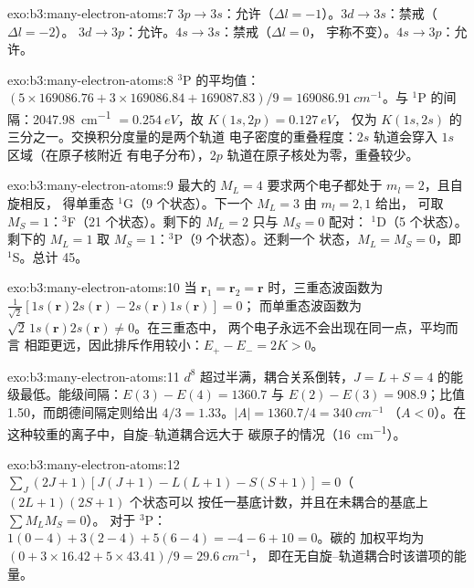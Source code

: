 \begin{solution}{exo:b3:many-electron-atoms:7}
$3p \to 3s$：允许（$\Delta l = -1$）。$3d \to 3s$：禁戒（$\Delta l = -2$）。
$3d \to 3p$：允许。$4s \to 3s$：禁戒（$\Delta l = 0$，
宇称不变）。$4s \to 3p$：允许。
\end{solution}

\begin{solution}{exo:b3:many-electron-atoms:8}
${}^3$P 的平均值：$(5 \times 169086.76 + 3 \times 169086.84 + 169087.83)/9 =
\qty{169086.91}{cm^{-1}}$。与 ${}^1$P 的间隔：\qty{2047.98}{cm^{-1}} $=
\qty{0.254}{eV}$，故 $K(1s,2p) = \qty{0.127}{eV}$，
仅为 $K(1s,2s)$ 的三分之一。交换积分度量的是两个轨道
电子密度的重叠程度：$2s$ 轨道会穿入 $1s$ 区域（在原子核附近
有电子分布），$2p$ 轨道在原子核处为零，重叠较少。
\end{solution}

\begin{solution}{exo:b3:many-electron-atoms:9}
最大的 $M_L = 4$ 要求两个电子都处于 $m_l = 2$，且自旋相反，
得单重态 ${}^1$G（9 个状态）。下一个 $M_L = 3$ 由 $m_l = 2, 1$ 给出，
可取 $M_S = 1$：${}^3$F（21 个状态）。剩下的 $M_L = 2$ 只与 $M_S = 0$ 配对：
${}^1$D（5 个状态）。剩下的 $M_L = 1$ 取 $M_S = 1$：${}^3$P（9 个状态）。还剩一个
状态，$M_L = M_S = 0$，即 ${}^1$S。总计 45。
\end{solution}

\begin{solution}{exo:b3:many-electron-atoms:10}
当 $\mathbf r_1 = \mathbf r_2 = \mathbf r$ 时，三重态波函数为
$\frac{1}{\sqrt2}[1s(\mathbf r)2s(\mathbf r) - 2s(\mathbf r)1s(\mathbf r)] = 0$；
而单重态波函数为 $\sqrt2\,1s(\mathbf r)2s(\mathbf r) \ne 0$。在三重态中，
两个电子永远不会出现在同一点，平均而言
相距更远，因此排斥作用较小：$E_+ - E_- = 2K > 0$。
\end{solution}

\begin{solution}{exo:b3:many-electron-atoms:11}
$d^8$ 超过半满，耦合关系倒转，$J = L + S = 4$
的能级最低。能级间隔：$E(3) - E(4) = 1360.7$ 与 $E(2) - E(3) = 908.9$；比值
1.50，而朗德间隔定则给出 $4/3 = 1.33$。$|A| = 1360.7/4 = \qty{340}{cm^{-1}}$
（$A < 0$）。在这种较重的离子中，自旋–轨道耦合远大于
碳原子的情况（\qty{16}{cm^{-1}}）。
\end{solution}

\begin{solution}{exo:b3:many-electron-atoms:12}
$\sum_J(2J+1)[J(J+1) - L(L+1) - S(S+1)] = 0$（$(2L+1)(2S+1)$ 个状态可以
按任一基底计数，并且在未耦合的基底上 $\sum M_LM_S = 0$）。
对于 ${}^3$P：$1(0 - 4) + 3(2 - 4) + 5(6 - 4) = -4 - 6 + 10 = 0$。碳的
加权平均为 $(0 + 3 \times 16.42 + 5 \times 43.41)/9 = \qty{29.6}{cm^{-1}}$，
即在无自旋–轨道耦合时该谱项的能量。
\end{solution}

